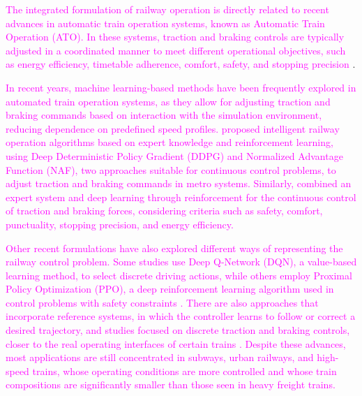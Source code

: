 \documentclass[preprint,10pt]{elsarticle}
\begin{document}
\textcolor{Magenta}{The integrated formulation of railway operation is directly related to recent advances in automatic train operation systems, known as Automatic Train Operation (ATO). In these systems, traction and braking controls are typically adjusted in a coordinated manner to meet different operational objectives, such as energy efficiency, timetable adherence, comfort, safety, and stopping precision \citep{zhou2020smart,chen2023research,huang2025enhanced}}.

\textcolor{Magenta}{In recent years, machine learning-based methods have been frequently explored in automated train operation systems, as they allow for adjusting traction and braking commands based on interaction with the simulation environment, reducing dependence on predefined speed profiles. \cite{zhou2020smart} proposed intelligent railway operation algorithms based on expert knowledge and reinforcement learning, using Deep Deterministic Policy Gradient (DDPG) and Normalized Advantage Function (NAF), two approaches suitable for continuous control problems, to adjust traction and braking commands in metro systems. Similarly, \cite{huang2025enhanced} combined an expert system and deep learning through reinforcement for the continuous control of traction and braking forces, considering criteria such as safety, comfort, punctuality, stopping precision, and energy efficiency.}

\textcolor{Magenta}{Other recent formulations have also explored different ways of representing the railway control problem. Some studies use Deep Q-Network (DQN), a value-based learning method, to select discrete driving actions, while others employ Proximal Policy Optimization (PPO), a deep reinforcement learning algorithm used in control problems with safety constraints \citep{chen2023research,cheng2024train}. There are also approaches that incorporate reference systems, in which the controller learns to follow or correct a desired trajectory, and studies focused on discrete traction and braking controls, closer to the real operating interfaces of certain trains \citep{shang2021deep,wei2022energy}. Despite these advances, most applications are still concentrated in subways, urban railways, and high-speed trains, whose operating conditions are more controlled and whose train compositions are significantly smaller than those seen in heavy freight trains.}
\end{document}
